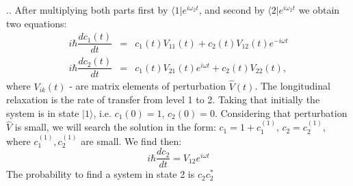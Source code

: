 \documentclass[handout]{beamer}
\begin{document}
\begin{frame}{\thesection.\thesubsection. \insertsubsection}
	After multiplying both parts first by $\langle 1 \vert e^{i \omega_2 t}$, and second by $\langle 2 \vert e^{i \omega_2 t}$ we obtain two equations:
	\begin{equation}
	  \begin{array}{lcl}
         i \hbar \dfrac{d c_1(t)}{d t} &=& c_1(t) V_{11}(t) + c_2(t)V_{12}(t) e^{-i \omega t} \\
         i \hbar \dfrac{d c_2(t)}{d t} &=& c_1(t) V_{21}(t)  e^{ i \omega t} + c_2(t)V_{22}(t),
	  \end{array}
	\end{equation}
	where $V_{ik}(t)$ - are matrix elements of perturbation $\hat{V}(t)$. The longitudinal relaxation is the rate of transfer from level 1 to 2. Taking that initially the system is in state $\vert 1 \rangle$, i.e. $c_1(0)=1$, $c_2(0)=0$. Considering that perturbation $\hat{V}$ is small, we will search the solution in the form: $c_1 = 1 + c_1^{(1)}$, $c_2 = c_2^{(1)}$, where $c_1^{(1)}, c_2^{(1)}$ are small. We find then:
	\begin{equation}
	    i \hbar \dfrac{d c_2}{d t}  = V_{12} e^{i \omega t}	    
	\end{equation}
	The probability to find a system in state 2 is $c_2 c_2^*$
\end{frame}
\end{document}
